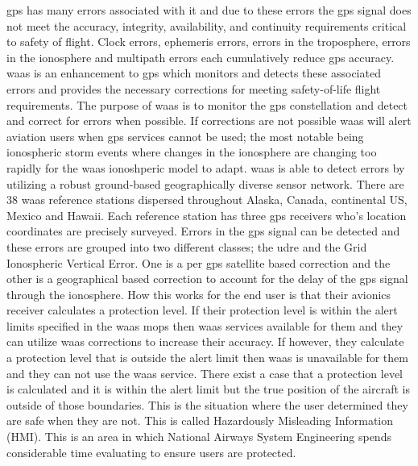 \ac{gps} has many errors associated with it and due to these errors the \ac{gps}
signal does not meet the accuracy, integrity, availability, and
continuity requirements critical to safety of flight. Clock errors,
ephemeris errors, errors in the troposphere, errors in the ionosphere
and multipath errors each cumulatively reduce \ac{gps} accuracy. \ac{waas} is an enhancement to \ac{gps} which monitors
and detects these associated errors and provides the necessary
corrections for meeting safety-of-life flight requirements. The purpose
of \ac{waas} is to monitor the \ac{gps} constellation and detect and correct for
errors when possible. If corrections are not possible \ac{waas} will alert
aviation users when \ac{gps} services cannot be used; the most notable being
ionospheric storm events where changes in the ionosphere are changing
too rapidly for the \ac{waas} ionoshperic model to adapt. \ac{waas} is able to
detect errors by utilizing a robust ground-based geographically diverse
sensor network. There are 38 \ac{waas} reference stations dispersed
throughout Alaska, Canada, continental US, Mexico and Hawaii. Each
reference station has three \ac{gps} receivers who's location coordinates are
precisely surveyed. Errors in the \ac{gps} signal can be detected and these
errors are grouped into two different classes; the \ac{udre} and the Grid Ionospheric Vertical Error. One is a per \ac{gps}
satellite based correction and the other is a geographical based
correction to account for the delay of the \ac{gps} signal through the
ionosphere. How this works for the end user is that their avionics
receiver calculates a protection level. If their protection level is
within the alert limits specified in the \ac{waas} \ac{mops} then \ac{waas}
services available for them and they can utilize \ac{waas} corrections to
increase their accuracy. If however, they calculate a protection level
that is outside the alert limit then \ac{waas} is unavailable for them and
they can not use the \ac{waas} service. There exist a case that a protection
level is calculated and it is within the alert limit but the true
position of the aircraft is outside of those boundaries. This is the
situation where the user determined they are safe when they are not.
This is called Hazardously Misleading Information (HMI). This is an area
in which National Airways System Engineering spends considerable time
evaluating to ensure users are protected.

